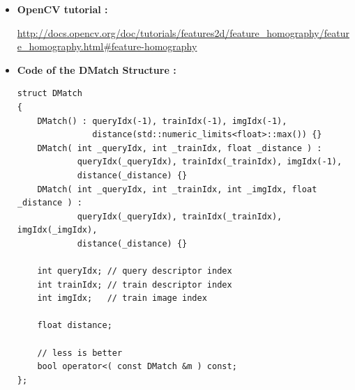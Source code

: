 \documentclass[english,a4paper,11pt]{report}
\begin{document}
	\begin{itemize}
	\item
		\hypertarget{opencv}{\textbf{OpenCV tutorial :\\}}	\url{http://docs.opencv.org/doc/tutorials/features2d/feature_homography/feature_homography.html#feature-homography}\\

	\item
	\hypertarget{structDMatch}{\textbf{Code of the DMatch Structure :}}
	\begin{lstlisting}
struct DMatch
{
    DMatch() : queryIdx(-1), trainIdx(-1), imgIdx(-1),
               distance(std::numeric_limits<float>::max()) {}
    DMatch( int _queryIdx, int _trainIdx, float _distance ) :
            queryIdx(_queryIdx), trainIdx(_trainIdx), imgIdx(-1),
            distance(_distance) {}
    DMatch( int _queryIdx, int _trainIdx, int _imgIdx, float _distance ) :
            queryIdx(_queryIdx), trainIdx(_trainIdx), imgIdx(_imgIdx),
            distance(_distance) {}

    int queryIdx; // query descriptor index
    int trainIdx; // train descriptor index
    int imgIdx;   // train image index

    float distance;

    // less is better
    bool operator<( const DMatch &m ) const;
};
	\end{lstlisting}	
	
\end{itemize}		
	


	\listoffigures
		
	
	
	
	

	
	
	
\end{document}

